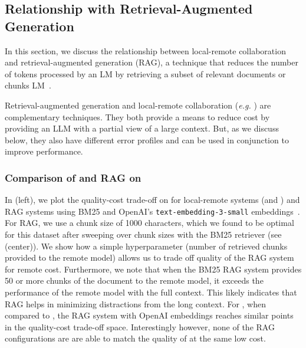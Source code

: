 \subsection{Relationship with Retrieval-Augmented Generation}\label{app:rag}


In this section, we discuss the relationship between local-remote collaboration and retrieval-augmented generation (RAG), a technique that reduces the number of tokens processed by an LM by retrieving a subset of relevant documents or chunks LM~\cite{lewis2020retrieval,karpukhin2020dense,lee2019latent}.

Retrieval-augmented generation and local-remote collaboration (\textit{e.g.} \system) are complementary techniques. 
They both provide a means to reduce cost by providing an LLM with a partial view of a large context. 
But, as we discuss below, they also have different error profiles and can be used in conjunction to improve performance.

\subsubsection{Comparison of \system and RAG on \finance}\label{app:rag:finance}
In  (left), we plot the quality-cost trade-off on \finance for local-remote systems (\naive and \system) and RAG systems using BM25 and OpenAI's \texttt{text-embedding-3-small} embeddings~\cite{article,neelakantan2022text}.
For RAG, we use a chunk size of 1000 characters, which we found to be optimal for this dataset after sweeping over chunk sizes with the BM25 retriever (see  (center)). We show how a simple hyperparameter (number of retrieved chunks provided to the remote model) allows us to trade off quality of the RAG system for remote cost.
% 
Furthermore, we note that when the BM25 RAG system provides 50 or more chunks of the document to the remote model, it exceeds the performance of the remote model with the full context. This likely indicates that RAG helps in minimizing distractions from the long context. 
% 
For \finance, when compared to \system, the RAG system with OpenAI embeddings reaches similar points in the quality-cost trade-off space. Interestingly however, none of the RAG configurations are are able to match the quality of \naive at the same low cost. 

